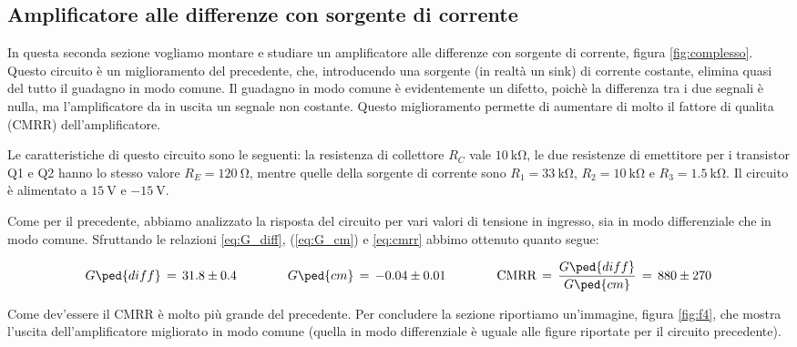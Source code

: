\subsection*{Amplificatore alle differenze con sorgente di corrente}

In questa seconda sezione vogliamo montare e studiare un amplificatore alle differenze con sorgente di corrente, figura \ref{fig:complesso}.
Questo circuito è un miglioramento del precedente, che, introducendo una sorgente (in realtà un sink) di corrente costante, elimina quasi del tutto
il guadagno in modo comune. Il guadagno in modo comune è evidentemente un difetto, poichè la differenza tra i due segnali è nulla, ma l'amplificatore
da in uscita un segnale non costante. Questo miglioramento permette di aumentare di molto il fattore di qualita (CMRR) dell'amplificatore.

Le caratteristiche di questo circuito sono le seguenti: la resistenza di collettore $R_C$ vale $\SI{10}{\kilo\ohm}$, le due resistenze di emettitore per i transistor Q1 e Q2 hanno lo stesso valore $R_E = \SI{120}{\ohm}$, mentre quelle della sorgente di corrente sono $R_1 = \SI{33}{\kilo\ohm}$, $R_2 = \SI{10}{\kilo\ohm}$ e $R_3 = \SI{1.5}{\kilo\ohm}$.
Il circuito è alimentato a $\SI{+15}{\volt}$ e $\SI{-15}{\volt}$.

Come per il precedente, abbiamo analizzato la risposta del circuito per vari valori di tensione in ingresso, sia in modo differenziale che in modo comune.
Sfruttando le relazioni \eqref{eq:G_diff}, (\ref{eq:G_cm}) e \eqref{eq:cmrr} abbimo ottenuto quanto segue:

\begin{equation}
    G\ped{diff}\,=\, 31.8 \pm 0.4  \qquad\qquad G\ped{cm}\,=\, -0.04 \pm 0.01 \qquad\qquad \text{CMRR}\,=\,\frac{G\ped{diff}}{G\ped{cm}}\,=\, 880 \pm 270
\end{equation}

Come dev'essere il CMRR è molto più grande del precedente.
Per concludere la sezione riportiamo un'immagine, figura \ref{fig:f4}, che mostra l'uscita dell'amplificatore migliorato in modo comune (quella in modo differenziale è uguale
alle figure riportate per il circuito precedente).
